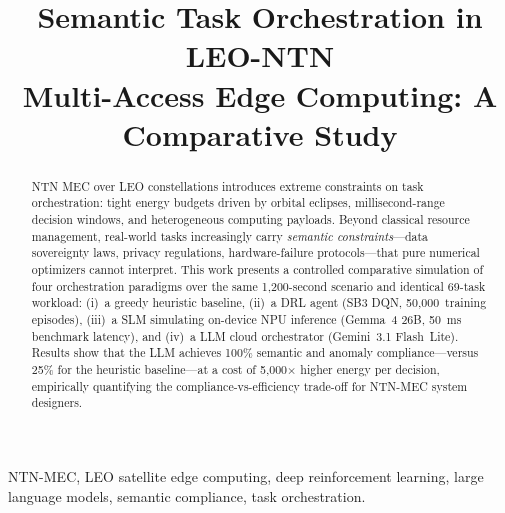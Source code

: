 \documentclass[conference,comsoc,twoside,caption=false]{IEEEtran}
\theoremstyle{definition}
\begin{document}
\author{
}
\title{\huge Semantic Task Orchestration in LEO-NTN\\
Multi-Access Edge Computing:
A Comparative Study}
\maketitle
    \newcommand{\MYheader}{\smash{\scriptsize
    \hfil\parbox[t][\height][t]{\textwidth}{\centering {}}\hfil\hbox{}}}
    \makeatletter
    \def\ps@IEEEtitlepagestyle{%
    \def\@oddhead{\MYheader}%
    \def\@evenhead{\MYheader}%
    \def\@oddfoot{}%
    \def\@evenfoot{}}
    \makeatother
    \pagestyle{headings}
    \addtolength{\footskip}{0\baselineskip}
    \addtolength{\textheight}{-0.1\baselineskip}
\begin{abstract}
\ac{NTN} \ac{MEC} over \ac{LEO} constellations introduces extreme constraints
on task orchestration: tight energy budgets driven by orbital eclipses,
millisecond-range decision windows, and heterogeneous computing payloads.
Beyond classical resource management, real-world tasks increasingly carry
\emph{semantic constraints}---data sovereignty laws, privacy regulations,
hardware-failure protocols---that pure numerical optimizers cannot interpret.
This work presents a controlled comparative simulation of four orchestration
paradigms over the same 1{,}200-second scenario and identical 69-task workload:
(i)~a greedy heuristic baseline, (ii)~a \ac{DRL} agent (SB3 DQN,
50{,}000~training episodes), (iii)~a \ac{SLM} simulating on-device NPU
inference (Gemma~4 26B, \SI{50}{\milli\second} benchmark latency), and
(iv)~a \ac{LLM} cloud orchestrator (Gemini~3.1 Flash~Lite). Results show that
the LLM achieves 100\% semantic and anomaly compliance---versus 25\% for the
heuristic baseline---at a cost of 5{,}000$\times$ higher energy per decision,
empirically quantifying the compliance-vs-efficiency trade-off for NTN-MEC
system designers.
\end{abstract}
\begin{IEEEkeywords}
NTN-MEC, LEO satellite edge computing, deep reinforcement learning,
large language models, semantic compliance, task orchestration.
\end{IEEEkeywords}
\acresetall
\IEEEpeerreviewmaketitle
\end{document}
